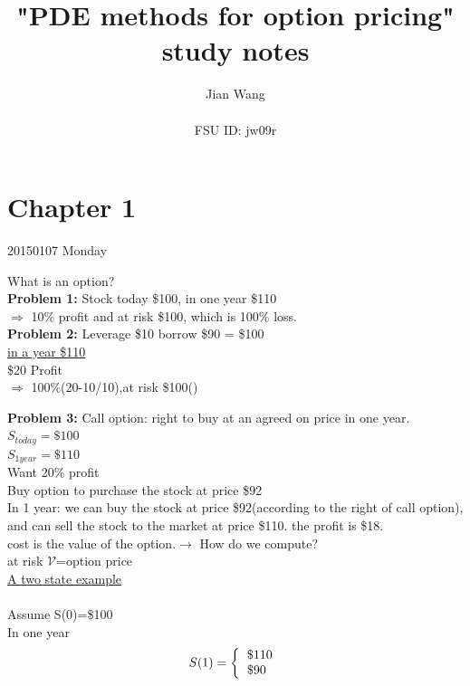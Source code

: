 \documentclass{article}
\title{ \vspace{-5mm}
        "PDE methods for option pricing" study notes}         %
\author{\Large{Jian Wang}\\      %
\\
FSU ID: jw09r}        %
\begin{document}
\maketitle
\section*{Chapter 1}
20150107 Monday
\large{
What is an option?\\

\textbf{Problem 1:} Stock today \$100, in one year \$110\\
\hspace*{2.5cm} $\Longrightarrow$ 10\% profit and at risk \$100, which is 100\% loss. \\

\textbf{Problem 2:} Leverage \$10 borrow \$90 = \$100\\
\hspace*{2.5cm} \underline{in a year \hspace*{3.1cm}  \$110}\\
\hspace*{6.5cm} \$20 Profit \\
\hspace*{5cm} $\Longrightarrow$ 100\%(20-10/10),at risk \$100({\color{red}{10+investment}})

\textbf{Problem 3:} Call option: right to buy at an agreed on price in one year.\\

$S_{today}=\$100$\\

$S_{1 year}=\$110$\\

Want 20\% profit\\

Buy option to purchase the stock at price \$92 \\

In 1 year: we can buy the stock at price \$92(according to the right of call option), and can sell the stock to the market at price \$110. the profit is \$18.\\
cost is the value of the option.$\rightarrow$ How do we compute?\\
at risk $\mathcal{V}$=option price\\

\underline{A two state example} \\
\\
Assume S(0)=\$100\\
In one year
\begin{equation*}
S(1)=\left\{
\begin{tabular}{l}
\$110  \\
\$90
\end{tabular}
\right.
\end{equation*}

}
\end{document}
